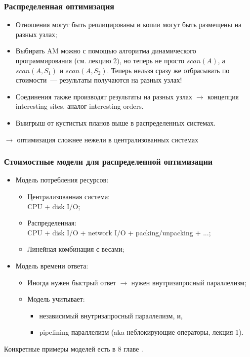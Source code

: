 \documentclass{beamer}
\begin{document}
\begin{frame}
\frametitle{Распределенная оптимизация}

\begin{itemize}
  \setlength\itemsep{1em}
  \item Отношения могут быть реплицированы и копии могут быть размещены на разных узлах;
  
  \item Выбирать AM можно с помощью алгоритма динамического программирования (см. лекцию 2), но теперь не просто $scan(A)$, а $scan(A, S_1)$ и $scan(A, S_2)$. Теперь нельзя сразу же отбрасывать по стоимости~--- результаты получаются на разных узлах!

  \item Соединения также производят результаты на разных узлах $\longrightarrow$ концепция interesting sites, аналог interesting orders. 
  
  \item Выигрыш от кустистых планов выше в распределенных системах.
\end{itemize}
$\longrightarrow$ оптимизация сложнее нежели в централизованных системах

\end{frame}


\begin{frame}
\frametitle{Стоимостные модели для распределенной оптимизации}

\begin{itemize}
  \setlength\itemsep{1em}
  \item Модель потребления ресурсов:
  \begin{itemize}
    \item Централизованная система: \\
    CPU + disk I/O;
    \item Распределенная: \\
    CPU + disk I/O + network I/O + packing/unpacking + ...;
    \item Линейная комбинация с весами;
  \end{itemize}

  \item Модель времени ответа:
  \begin{itemize}
    \item Иногда нужен быстрый ответ $\longrightarrow$ нужен внутризапросный параллелизм;
    \item Модель учитывает: 
    \begin{itemize}
    	\item независимый внутризапросный параллелизм, и,
    	\item pipelining параллелизм (aka неблокирующие операторы, лекция 1).
    \end{itemize}
    
  \end{itemize}
  
\end{itemize}

Конкретные примеры моделей есть в 8 главе \cite{Ozsu2011}.

\end{frame}
\end{document}
